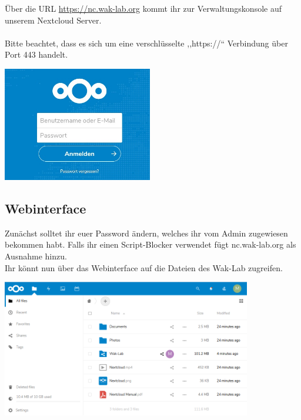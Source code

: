 Über die URL \url{https://nc.wak-lab.org} kommt ihr zur Verwaltungskonsole auf unserem Nextcloud Server. \\
\ \\
Bitte beachtet, dass es sich um eine verschlüsselte ,,https://`` Verbindung über Port 443 handelt.\\

\begin{minipage}[t]{\textwidth}
  \centering
  \includegraphics[height=5cm]{pictures/Nextcloudlogin.jpg}
  \label{img:Nextcloudlogin}
\end{minipage}

\subsection{Webinterface}
Zunächst solltet ihr euer Password ändern, welches ihr vom Admin zugewiesen bekommen habt. Falls ihr einen Script-Blocker verwendet fügt nc.wak-lab.org als Ausnahme hinzu.\\
Ihr könnt nun über das Webinterface auf die Dateien des Wak-Lab zugreifen.\\
 
\begin{minipage}[t]{\textwidth}
  \centering
  \includegraphics[height=6cm]{pictures/NextcloudWebinterface.png}
  \label{img:NextcloudWebinterface}
\end{minipage}


